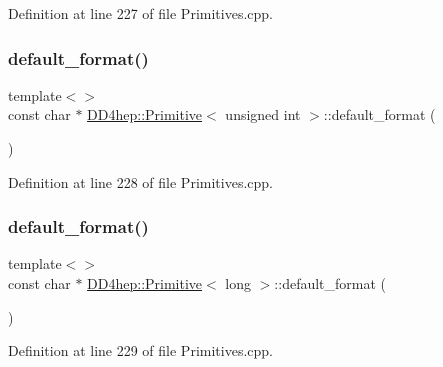 Definition at line 227 of file Primitives.\+cpp.

\hypertarget{struct_d_d4hep_1_1_primitive_aaa233fa9267fbb95652212f23a4145ad}{}\label{struct_d_d4hep_1_1_primitive_aaa233fa9267fbb95652212f23a4145ad} 
\subsubsection{\texorpdfstring{default\+\_\+format()}{default\_format()}\hspace{0.1cm}{\footnotesize\ttfamily [8/15]}}
{\footnotesize\ttfamily template$<$$>$ \\
const char $\ast$ \hyperlink{struct_d_d4hep_1_1_primitive}{D\+D4hep\+::\+Primitive}$<$ unsigned int $>$\+::default\+\_\+format (\begin{DoxyParamCaption}{ }\end{DoxyParamCaption})}



Definition at line 228 of file Primitives.\+cpp.

\hypertarget{struct_d_d4hep_1_1_primitive_acf18ce3be7ed74fe60f2e9983d3eaaaf}{}\label{struct_d_d4hep_1_1_primitive_acf18ce3be7ed74fe60f2e9983d3eaaaf} 
\subsubsection{\texorpdfstring{default\+\_\+format()}{default\_format()}\hspace{0.1cm}{\footnotesize\ttfamily [9/15]}}
{\footnotesize\ttfamily template$<$$>$ \\
const char $\ast$ \hyperlink{struct_d_d4hep_1_1_primitive}{D\+D4hep\+::\+Primitive}$<$ long $>$\+::default\+\_\+format (\begin{DoxyParamCaption}{ }\end{DoxyParamCaption})}



Definition at line 229 of file Primitives.\+cpp.

\hypertarget{struct_d_d4hep_1_1_primitive_a415aa3b8c09212b73f6d08fd879a6a7c}{}\label{struct_d_d4hep_1_1_primitive_a415aa3b8c09212b73f6d08fd879a6a7c} 
